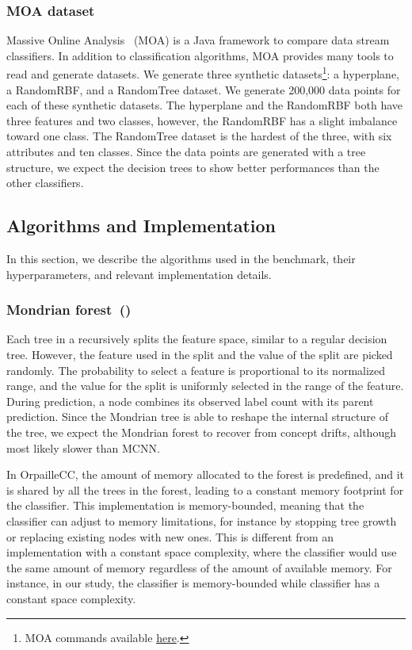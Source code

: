 \subsubsection{MOA dataset}
Massive Online Analysis~\cite{moa} (MOA) is a Java framework to compare
data stream classifiers. In addition to classification algorithms, MOA provides many
tools to read and generate datasets.
We generate three synthetic datasets\footnote{MOA commands available \href{https://github.com/azazel7/paper-benchmark/blob/e0c9a94d0d17490f7ab14293dec20b8322a6447c/Makefile\#L90}{here}.}:
a hyperplane, a RandomRBF, and a RandomTree
dataset. We generate 200,000 data points
 for each of these synthetic datasets.
The hyperplane and the RandomRBF both have three features and two classes, however, the RandomRBF has a slight imbalance toward one class.
The RandomTree dataset is the hardest of the three, with six attributes and
ten classes. Since the data points are generated with a tree structure, we
expect the decision trees to show better performances than the other
classifiers.

\subsection{Algorithms and Implementation}
In this section, we describe the algorithms used in the benchmark, their
hyperparameters, and relevant implementation details. 

\subsubsection{Mondrian forest~(\mondrianforest)~\cite{mondrian2014}}
Each tree in a \mondrianforest recursively splits the feature space, similar to
a regular decision tree.  However, the feature used in the split and the value
of the split are picked randomly. The probability to select a feature is
proportional to its normalized range, and the value for the split is uniformly
selected in the range of the feature.  During prediction, a node combines its
observed label count with its parent prediction. Since the Mondrian tree is able
to reshape the internal structure of the tree, we expect the Mondrian forest to
recover from concept drifts, although most likely slower than MCNN.

In OrpailleCC, the amount of memory allocated to the forest is predefined,
and it is shared by all the trees in the forest, leading to a constant
memory footprint for the classifier. This implementation is memory-bounded,
meaning that the classifier can adjust to memory limitations, for instance
by stopping tree growth or replacing existing nodes with new ones. This is
different from an implementation with a constant space complexity, where
the classifier would use the same amount of memory regardless of the
amount of available memory. For instance, in our study, the \mondrianforest
classifier is memory-bounded while \naivebayes classifier has a constant
space complexity.

